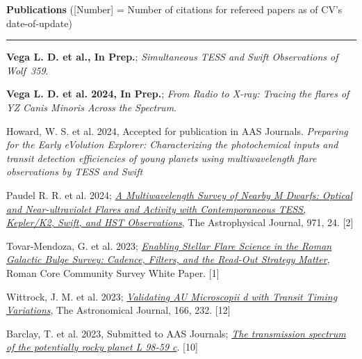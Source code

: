 \documentclass[letter,12pt]{article}
\begin{document}
\noindent
{\bf Publications} ([Number] = Number of citations for refereed papers as of CV's date-of-update) \\
\vspace{-10mm}
\begin{center}
\rule{\textwidth}{0.2mm}
\end{center}
\vspace{-3mm}
\noindent
\begin{etaremune}
\renewcommand\labelenumi{\bfseries\theenumi .}
\item {\bf Vega L. D. et al., In Prep.}; {\it Simultaneous TESS and Swift Observations of Wolf~359}.

\item {\bf Vega L. D. et al. 2024, In Prep.}; {\it From Radio to X-ray: Tracing the flares of YZ Canis Minoris Across the Spectrum}.

\item {Howard, W. S. et al. 2024, Accepted for publication in AAS Journals.} 
{\it Preparing for the Early eVolution Explorer: Characterizing the photochemical inputs and transit detection efficiencies of young planets using multiwavelength flare observations by TESS and Swift}

\item {Paudel R. R. et al. 2024}; 
\href{https://ui.adsabs.harvard.edu/abs/2024ApJ...971...24P/abstract}{\it A Multiwavelength Survey of Nearby M Dwarfs: Optical and Near-ultraviolet Flares and Activity with Contemporaneous TESS, Kepler/K2, {\it Swift}, and HST Observations}, The Astrophysical Journal, 971, 24. [2]

\item {Tovar-Mendoza, G. et al. 2023};
\href{https://ui.adsabs.harvard.edu/abs/2023arXiv230705806T/abstract}{\it Enabling Stellar Flare Science in the Roman Galactic Bulge Survey: Cadence, Filters, and the Read-Out Strategy Matter}, Roman Core Community Survey White Paper. [1]

\item {Wittrock, J. M. et al. 2023};
\href{https://ui.adsabs.harvard.edu/abs/2023arXiv230204922W/abstract}{\it Validating AU Microscopii d with Transit Timing Variations}, The Astronomical Journal, 166, 232. [12]

\item {Barclay, T. et al. 2023, Submitted to AAS Journals}; \href{https://ui.adsabs.harvard.edu/abs/2023arXiv230110866B/abstract}{\it The transmission spectrum of the potentially rocky planet L 98-59 c}. [10]


\end{etaremune}
\end{document}
